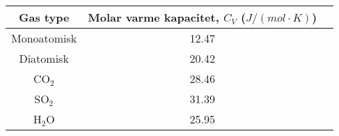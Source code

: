 \begin{tabular}{|c|c|c|}
	\hline
	Gas type&Molar varme kapacitet, $C_V$ ($J/(mol\cdot K)$)\\
	\hline
	Monoatomisk&12.47\\
	Diatomisk&20.42\\
	CO$_2$&28.46\\
	SO$_2$&31.39\\
	H$_2$O&25.95\\
	\hline
\end{tabular}